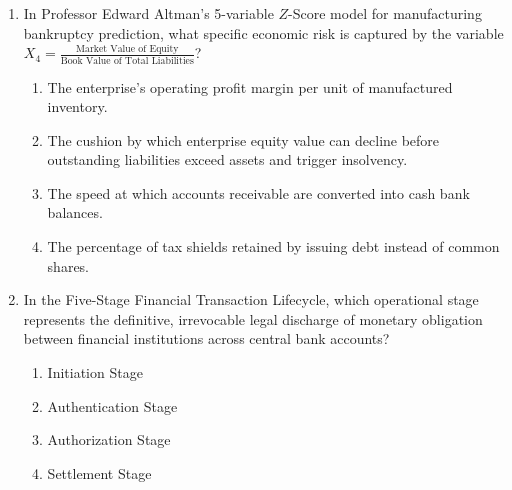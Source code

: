 \begin{enumerate}[label=\textbf{MCQ 7.\arabic*}]
    \item In Professor Edward Altman's 5-variable $Z$-Score model for manufacturing bankruptcy prediction, what specific economic risk is captured by the variable $X_4 = \frac{\text{Market Value of Equity}}{\text{Book Value of Total Liabilities}}$?
    \begin{enumerate}[label=(\alph*)]
        \item The enterprise's operating profit margin per unit of manufactured inventory.
        \item The cushion by which enterprise equity value can decline before outstanding liabilities exceed assets and trigger insolvency.
        \item The speed at which accounts receivable are converted into cash bank balances.
        \item The percentage of tax shields retained by issuing debt instead of common shares.
    \end{enumerate}

    \item In the Five-Stage Financial Transaction Lifecycle, which operational stage represents the definitive, irrevocable legal discharge of monetary obligation between financial institutions across central bank accounts?
    \begin{enumerate}[label=(\alph*)]
        \item Initiation Stage
        \item Authentication Stage
        \item Authorization Stage
        \item Settlement Stage
    \end{enumerate}
\end{enumerate}

